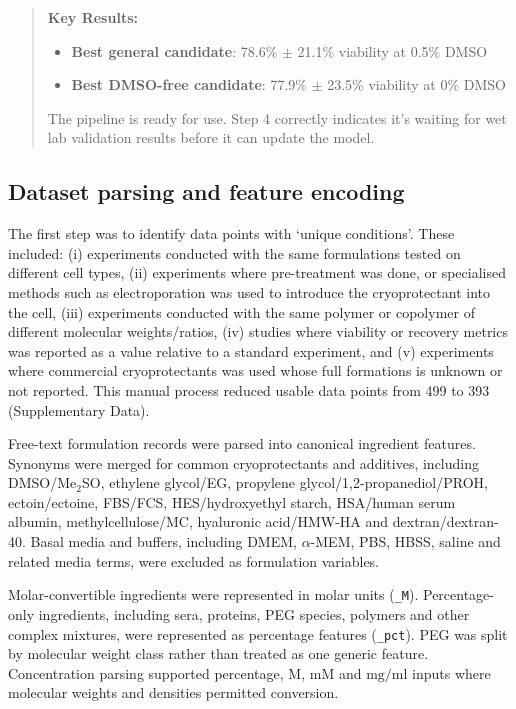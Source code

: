 \documentclass[preprint,12pt]{elsarticle}
\newenvironment{promptbar}{\begin{quote}\scriptsize\raggedright\sloppy}{\end{quote}}
\begin{document}
\begin{promptbar}
\textbf{Key Results:}
\begin{itemize}
\item \textbf{Best general candidate}: 78.6\% \(\pm\) 21.1\% viability at 0.5\% DMSO
\item \textbf{Best DMSO-free candidate}: 77.9\% \(\pm\) 23.5\% viability at 0\% DMSO
\end{itemize}

The pipeline is ready for use. Step 4 correctly indicates it's waiting for wet lab validation results before it can update the model.

\end{promptbar}
\endgroup

\subsection{Dataset parsing and feature encoding}

The first step was to identify data points with ‘unique conditions’. These included: (i) experiments conducted with the same formulations tested on different cell types, (ii) experiments where pre-treatment was done, or specialised methods such as electroporation was used to introduce the cryoprotectant into the cell, (iii) experiments conducted with the same polymer or copolymer of different molecular weights/ratios, (iv) studies where viability or recovery metrics was reported as a value relative to a standard experiment, and (v) experiments where commercial cryoprotectants was used whose full formations is unknown or not reported. This  manual process reduced usable data points
from 499 to 393 (Supplementary Data).

Free-text formulation records were parsed into canonical ingredient features. Synonyms were merged for common cryoprotectants and additives, including DMSO/Me\(_2\)SO, ethylene glycol/EG, propylene glycol/1,2-propanediol/PROH, ectoin/ectoine, FBS/FCS, HES/hydroxyethyl starch, HSA/human serum albumin, methylcellulose/MC, hyaluronic acid/HMW-HA and dextran/dextran-40. Basal media and buffers, including DMEM, \(\alpha\)-MEM, PBS, HBSS, saline and related media terms, were excluded as formulation variables.

Molar-convertible ingredients were represented in molar units (\texttt{\_M}). Percentage-only ingredients, including sera, proteins, PEG species, polymers and other complex mixtures, were represented as percentage features (\texttt{\_pct}). PEG was split by molecular weight class rather than treated as one generic feature. Concentration parsing supported percentage, M, mM and \(\mathrm{mg}/\mathrm{ml}\) inputs where molecular weights and densities permitted conversion.
\end{document}
